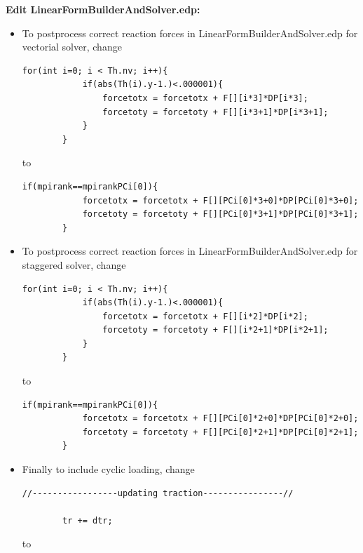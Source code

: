 {{\begin{itemize}
\end{itemize}


\textbf{Edit LinearFormBuilderAndSolver.edp:}

\begin{itemize}
	
	\item To postprocess correct reaction forces in LinearFormBuilderAndSolver.edp for vectorial solver, change
	
	\begin{lstlisting}[style=CppStyle]
		for(int i=0; i < Th.nv; i++){
			if(abs(Th(i).y-1.)<.000001){
				forcetotx = forcetotx + F[][i*3]*DP[i*3];           
				forcetoty = forcetoty + F[][i*3+1]*DP[i*3+1];       
			}
		} 
	\end{lstlisting}
	
	to
	
	\begin{lstlisting}[style=CppStyle]
		if(mpirank==mpirankPCi[0]){
			forcetotx = forcetotx + F[][PCi[0]*3+0]*DP[PCi[0]*3+0];
			forcetoty = forcetoty + F[][PCi[0]*3+1]*DP[PCi[0]*3+1]; 
		} 
	\end{lstlisting}
	
	\item To postprocess correct reaction forces in LinearFormBuilderAndSolver.edp for staggered solver, change
	
	\begin{lstlisting}[style=CppStyle]
		for(int i=0; i < Th.nv; i++){
			if(abs(Th(i).y-1.)<.000001){
				forcetotx = forcetotx + F[][i*2]*DP[i*2];           
				forcetoty = forcetoty + F[][i*2+1]*DP[i*2+1];       
			}
		}
	\end{lstlisting}
	
	to
	
	\begin{lstlisting}[style=CppStyle]
		if(mpirank==mpirankPCi[0]){
			forcetotx = forcetotx + F[][PCi[0]*2+0]*DP[PCi[0]*2+0];
			forcetoty = forcetoty + F[][PCi[0]*2+1]*DP[PCi[0]*2+1]; 
		} 
	\end{lstlisting}
	
	\item Finally to include cyclic loading, change
	
	\begin{lstlisting}[style=CppStyle]
		//-----------------updating traction----------------//
		
		tr += dtr; 
	\end{lstlisting}
	
	
	to
	

\end{itemize}}}

